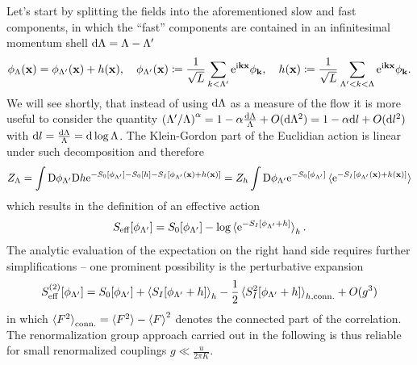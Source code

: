 Let's start by splitting the fields into the aforementioned slow and fast components, in which the ``fast'' components are contained in an infinitesimal momentum shell $\mathrm d\Lambda=\Lambda-\Lambda'$
\begin{align}
    \phi_\Lambda({\bf x}) = \phi_{\Lambda'}({\bf x}) + h({\bf x}),
    \quad
    \phi_{\Lambda'}({\bf x})\coloneqq\frac1{\sqrt L}\sum_{k<\Lambda'}\mathrm e^{\mathrm i {\bf k}{\bf x}}\phi_{\bf k},
    \quad
    h({\bf x}) \coloneqq \frac1{\sqrt L}\sum_{\Lambda'<k<\Lambda}\mathrm e^{\mathrm i {\bf k}{\bf x}}\phi_{\bf k}.
\end{align}
We will see shortly, that instead of using $\mathrm d\Lambda$ as a measure of the flow it is more useful to consider the quantity $\left( \Lambda'/\Lambda \right)^\alpha=1-\alpha\frac{\mathrm d\Lambda}\Lambda + O(\mathrm d\Lambda^2) = 1-\alpha\mathrm d l + O(\mathrm d l^2)$ with $\mathrm d l =\frac{\mathrm d\Lambda}\Lambda = \mathrm d\log\Lambda$.
The Klein-Gordon part of the Euclidian action is linear under such decomposition and therefore
\begin{align}
    Z_\Lambda
    = \int\mathrm D\phi_{\Lambda'}\mathrm D h \mathrm e^{-S_0[\phi_{\Lambda'}]-S_0[h]-S_I[\phi_{\Lambda'}({\bf x}) + h({\bf x})]}
    = Z_h\int\mathrm D\phi_{\Lambda'}\mathrm e^{-S_0[\phi_{\Lambda'}]}\braket{\mathrm e^{-S_I[\phi_{\Lambda'}({\bf x}) + h({\bf x})]}}
\end{align}
which results in the definition of an effective action
\begin{align}
    S_{\rm eff}[\phi_{\Lambda'}] = S_0[\phi_{\Lambda'}] - \log\braket{\mathrm e^{-S_I[\phi_{\Lambda'}+h]}}_h.
\end{align}
The analytic evaluation of the expectation on the right hand side requires further simplifications -- one prominent possibility is the perturbative expansion
\begin{align}
    S^{(2)}_{\rm eff}[\phi_{\Lambda'}] = S_0[\phi_{\Lambda'}] + \braket{S_I[\phi_{\Lambda'}+h]}_h - \frac12\braket{S^2_I[\phi_{\Lambda'}+h]}_{h,{\rm conn.}} + O(g^3)
\end{align}
in which $\braket{F^2}_{\rm conn.} = \braket{F^2}-\braket{F}^2$ denotes the connected part of the correlation.
The renormalization group approach carried out in the following is thus reliable for small renormalized couplings $g\ll \frac u{2\pi K}$.
\\

